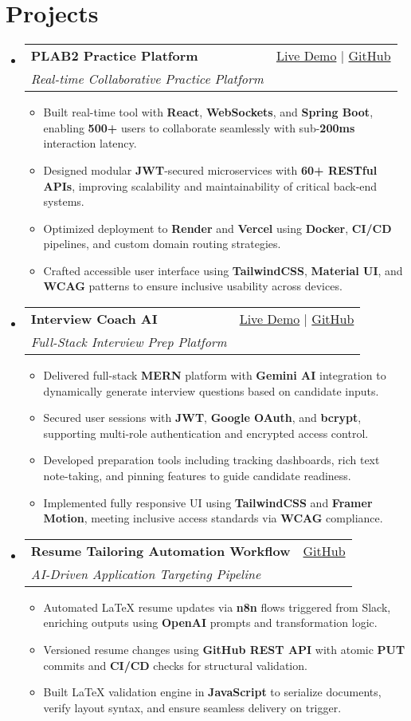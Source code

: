 \documentclass[letterpaper,10pt]{article}
\makeatletter
\newcommand{\resumeItem}[1]{\item\small{#1 \vspace{-2pt}}}
\newcommand{\resumeSubheading}[4]{
  \vspace{-1pt}\item
    \begin{tabular*}{0.97\textwidth}[t]{l@{\extracolsep{\fill}}r}
      \textbf{#1} & #2 \\
      \textit{\small#3} & \textit{\small #4} \\
    \end{tabular*}\vspace{-5pt}
}
\newcommand{\resumeSubHeadingListStart}{\begin{itemize}[leftmargin=*]}
\newcommand{\resumeSubHeadingListEnd}{\end{itemize}}
\newcommand{\resumeItemListStart}{\begin{itemize}}
\newcommand{\resumeItemListEnd}{\end{itemize}\vspace{-5pt}}
\makeatother
\begin{document}
\section{Projects}
  \resumeSubHeadingListStart
    \resumeSubheading
      {\textbf{PLAB2 Practice Platform}}{\href{https://plab2practice.com}{Live Demo} | \href{https://github.com/altansaid/plab2projectnew}{GitHub}}
      {Real-time Collaborative Practice Platform}{}
      \resumeItemListStart
        \resumeItem{Built real-time tool with \textbf{React}, \textbf{WebSockets}, and \textbf{Spring Boot}, enabling \textbf{500+} users to collaborate seamlessly with sub-\textbf{200ms} interaction latency.}
        \resumeItem{Designed modular \textbf{JWT}-secured microservices with \textbf{60+ RESTful APIs}, improving scalability and maintainability of critical back-end systems.}
        \resumeItem{Optimized deployment to \textbf{Render} and \textbf{Vercel} using \textbf{Docker}, \textbf{CI/CD} pipelines, and custom domain routing strategies.}
        \resumeItem{Crafted accessible user interface using \textbf{TailwindCSS}, \textbf{Material UI}, and \textbf{WCAG} patterns to ensure inclusive usability across devices.}
      \resumeItemListEnd

    \resumeSubheading
      {\textbf{Interview Coach AI}}{\href{https://interviewcoach-ai.vercel.app}{Live Demo} | \href{https://github.com/altansaid/interviewcoach-ai}{GitHub}}
      {Full-Stack Interview Prep Platform}{}
      \resumeItemListStart
        \resumeItem{Delivered full-stack \textbf{MERN} platform with \textbf{Gemini AI} integration to dynamically generate interview questions based on candidate inputs.}
        \resumeItem{Secured user sessions with \textbf{JWT}, \textbf{Google OAuth}, and \textbf{bcrypt}, supporting multi-role authentication and encrypted access control.}
        \resumeItem{Developed preparation tools including tracking dashboards, rich text note-taking, and pinning features to guide candidate readiness.}
        \resumeItem{Implemented fully responsive UI using \textbf{TailwindCSS} and \textbf{Framer Motion}, meeting inclusive access standards via \textbf{WCAG} compliance.}
      \resumeItemListEnd

    \resumeSubheading
      {\textbf{Resume Tailoring Automation Workflow}}{\href{https://github.com/altansaid/resume-updates}{GitHub}}
      {AI-Driven Application Targeting Pipeline}{}
      \resumeItemListStart
        \resumeItem{Automated LaTeX resume updates via \textbf{n8n} flows triggered from Slack, enriching outputs using \textbf{OpenAI} prompts and transformation logic.}
        \resumeItem{Versioned resume changes using \textbf{GitHub REST API} with atomic \textbf{PUT} commits and \textbf{CI/CD} checks for structural validation.}
        \resumeItem{Built LaTeX validation engine in \textbf{JavaScript} to serialize documents, verify layout syntax, and ensure seamless delivery on trigger.}
      \resumeItemListEnd
  \resumeSubHeadingListEnd
\end{document}
